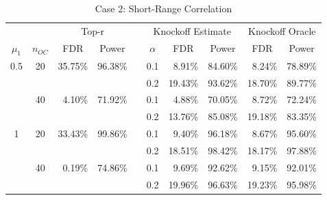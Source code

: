 \documentclass[]{interact}
\theoremstyle{plain}%
\theoremstyle{definition}
\theoremstyle{remark}
\begin{document}
\begin{table}[htbp]
  \centering
  \caption{Case 2: Short-Range Correlation}
    \begin{tabular}{ccrrrrrrrr}
    \toprule
      &   & \multicolumn{2}{c}{Top-r} &   & \multicolumn{3}{c}{Knockoff Estimate} & \multicolumn{2}{c}{Knockoff Oracle} \\
\cmidrule{3-4}\cmidrule{6-10}    \multicolumn{1}{c}{$\mu_1$} & \multicolumn{1}{c}{$n_{OC}$} & \multicolumn{1}{c}{FDR} & \multicolumn{1}{c}{Power} &   & \multicolumn{1}{c}{$\alpha$} & \multicolumn{1}{c}{FDR} & \multicolumn{1}{c}{Power} & \multicolumn{1}{c}{FDR} & \multicolumn{1}{c}{Power} \\
\cmidrule{1-4}\cmidrule{6-10}    0.5 & 20 & 35.75\% & 96.38\% &   & 0.1 & 8.91\% & 84.60\% & 8.24\% & 78.89\% \\
      &   &   &   &   & 0.2 & 19.43\% & 93.62\% & 18.70\% & 89.77\% \\
      & 40 & 4.10\% & 71.92\% &   & 0.1 & 4.88\% & 70.05\% & 8.72\% & 72.24\% \\
      &   &   &   &   & 0.2 & 13.76\% & 85.08\% & 19.18\% & 83.35\% \\
    1 & 20 & 33.43\% & 99.86\% &   & 0.1 & 9.40\% & 96.18\% & 8.67\% & 95.60\% \\
      &   &   &   &   & 0.2 & 18.51\% & 98.42\% & 18.17\% & 97.88\% \\
      & 40 & 0.19\% & 74.86\% &   & 0.1 & 9.69\% & 92.62\% & 9.15\% & 92.01\% \\
      &   &   &   &   & 0.2 & 19.96\% & 96.63\% & 19.23\% & 95.98\% \\
      \bottomrule
    \end{tabular}%
  \label{tab:addlabel}%
\end{table}%
\end{document}
